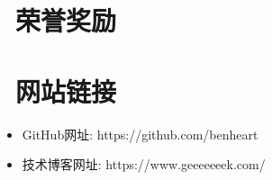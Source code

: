 \documentclass{resume}
\begin{document}
    \section{\faTrophy\ 荣誉奖励}
    \blankline{ }

    \section{\faLink\ 网站链接}
    \begin{itemize}[parsep=0.5ex]
        \item GitHub网址: https://github.com/benheart
        \item 技术博客网址: https://www.geeeeeeek.com/
    \end{itemize}
\end{document}

